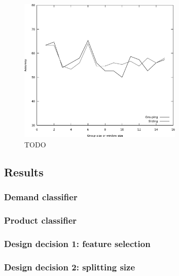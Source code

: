 \begin{figure}
	\label{fig:sampling_optimization}
	\begin{center}
		\includegraphics[width=0.7\textwidth]{figures/sampling_optimization.eps}
	\end{center}
	\caption{TODO}
\end{figure}


\subsection{Results}
\label{sub:results}

\subsubsection{Demand classifier}
\label{ssub:demand_classifier}


\subsubsection{Product classifier}
\label{ssub:product_classifier}

\subsubsection{Design decision 1: feature selection}

\subsubsection{Design decision 2: splitting size}

